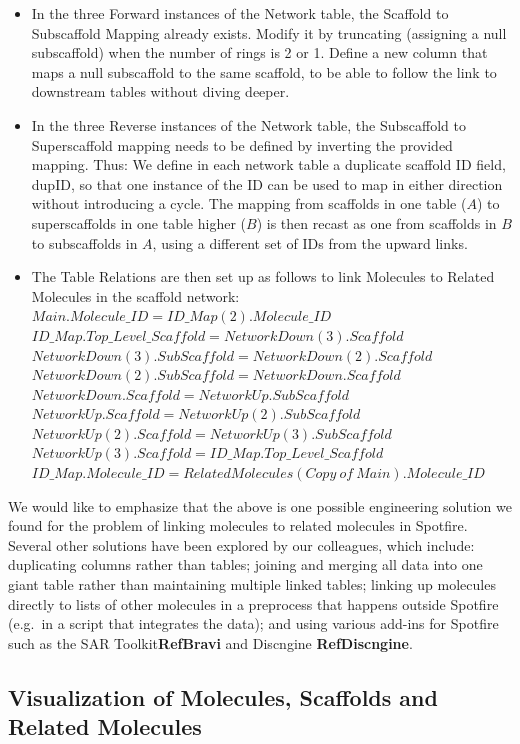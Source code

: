 \documentclass[journal=jacsat,manuscript=article]{achemso}
\newcommand*\eg{e.g.~}
\begin{document}
\begin{itemize}
\item In the three Forward instances of the Network table, the
  Scaffold to Subscaffold Mapping already exists. Modify it by
  truncating (assigning a null subscaffold) when the number of rings
  is 2 or 1.  \subitem Define a new column that maps a null
  subscaffold to the same scaffold, to be able to follow the link to
  downstream tables without diving deeper.
\item In the three Reverse instances of the Network table, the
  Subscaffold to Superscaffold mapping needs to be defined by
  inverting the provided mapping. Thus: \subitem We define in each
  network table a duplicate scaffold ID field, dupID, so that one
  instance of the ID can be used to map in either direction without
  introducing a cycle.  \subitem The mapping from scaffolds in one
  table ($A$) to superscaffolds in one table higher ($B$) is then
  recast as one from scaffolds in $B$ to subscaffolds in $A$, using a
  different set of IDs from the upward links.
\item The Table Relations are then set up as follows to link Molecules
  to Related Molecules in the scaffold network: \subitem
  $Main.Molecule\_ID = ID\_Map(2).Molecule\_ID$ \subitem
  $ID\_Map.Top\_Level\_Scaffold = NetworkDown(3).Scaffold$ \subitem
  $NetworkDown(3).SubScaffold = NetworkDown(2).Scaffold$ \subitem
  $NetworkDown(2).SubScaffold = NetworkDown.Scaffold$ \subitem
  $NetworkDown.Scaffold = NetworkUp.SubScaffold$ \subitem
  $NetworkUp.Scaffold = NetworkUp(2).SubScaffold$ \subitem
  $NetworkUp(2).Scaffold = NetworkUp(3).SubScaffold$ \subitem
  $NetworkUp(3).Scaffold = ID\_Map.Top\_Level\_Scaffold$ \subitem
  $ID\_Map.Molecule\_ID = Related
  Molecules(Copy~of~Main).Molecule\_ID$
\end{itemize}   

We would like to emphasize that the above is one possible engineering solution we found for the problem of linking molecules to related molecules in Spotfire.  Several other solutions have been explored by our colleagues, which include: duplicating columns rather than tables; joining and merging all data into one giant table rather than maintaining multiple linked tables; linking up molecules directly to lists of other molecules in a preprocess that happens outside Spotfire (\eg in a script that integrates the data); and using various add-ins for Spotfire such as the SAR Toolkit{\bf RefBravi} and Discngine {\bf RefDiscngine}.
 
\subsection{Visualization of Molecules, Scaffolds and Related Molecules}
\end{document}
